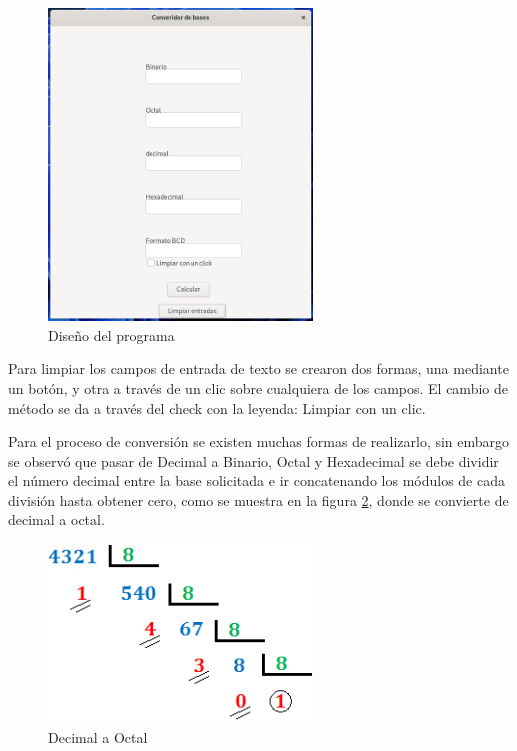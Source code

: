 \documentclass[letterpaper,12pt]{extarticle}%
\begin{document}
\begin{multicols}{2}
		\begin{figure}[H]
		\begin{center}
		\includegraphics[width=7cm]{imag//ProgramDesign.png}
		\caption{Diseño del programa}
		\label{ProgramDesign}
		\end{center}
 		\end{figure}

		Para limpiar los campos de entrada de texto se crearon dos formas, una mediante
		un botón, y otra a través de un clic sobre cualquiera de los campos. El cambio de 
		método se da a través del check con la leyenda: Limpiar con un clic.
		
		Para el proceso de conversión se existen muchas formas de realizarlo, sin embargo
		se observó que pasar de Decimal a Binario, Octal y Hexadecimal se debe dividir el número
		decimal entre la base solicitada e ir concatenando los módulos de cada división
		hasta obtener cero, como se muestra en la figura \ref{decToOct}, donde se convierte de decimal
		a octal.

		\begin{figure}[H]
		\begin{center}
		\includegraphics[width=7cm]{imag//decimalToOctal.png}
		\caption{Decimal a Octal}
		\label{decToOct}
		\end{center}
		\end{figure}


\end{multicols}
\end{document}
